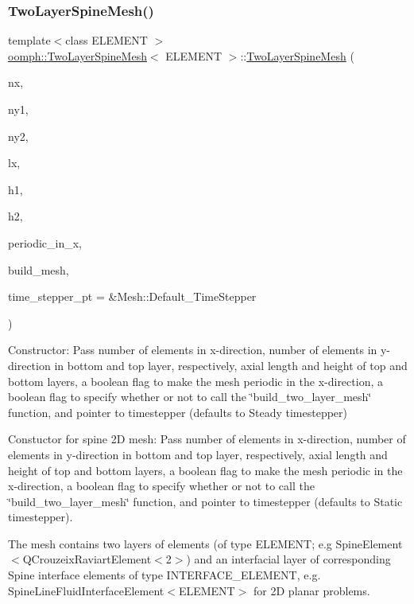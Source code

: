 \subsubsection{\texorpdfstring{Two\+Layer\+Spine\+Mesh()}{TwoLayerSpineMesh()}\hspace{0.1cm}{\footnotesize\ttfamily [3/3]}}
{\footnotesize\ttfamily template$<$class E\+L\+E\+M\+E\+NT $>$ \\
\hyperlink{classoomph_1_1TwoLayerSpineMesh}{oomph\+::\+Two\+Layer\+Spine\+Mesh}$<$ E\+L\+E\+M\+E\+NT $>$\+::\hyperlink{classoomph_1_1TwoLayerSpineMesh}{Two\+Layer\+Spine\+Mesh} (\begin{DoxyParamCaption}\item[{const unsigned \&}]{nx,  }\item[{const unsigned \&}]{ny1,  }\item[{const unsigned \&}]{ny2,  }\item[{const double \&}]{lx,  }\item[{const double \&}]{h1,  }\item[{const double \&}]{h2,  }\item[{const bool \&}]{periodic\+\_\+in\+\_\+x,  }\item[{const bool \&}]{build\+\_\+mesh,  }\item[{Time\+Stepper $\ast$}]{time\+\_\+stepper\+\_\+pt = {\ttfamily \&Mesh\+:\+:Default\+\_\+TimeStepper} }\end{DoxyParamCaption})}



Constructor\+: Pass number of elements in x-\/direction, number of elements in y-\/direction in bottom and top layer, respectively, axial length and height of top and bottom layers, a boolean flag to make the mesh periodic in the x-\/direction, a boolean flag to specify whether or not to call the \char`\"{}build\+\_\+two\+\_\+layer\+\_\+mesh\char`\"{} function, and pointer to timestepper (defaults to Steady timestepper) 

Constuctor for spine 2D mesh\+: Pass number of elements in x-\/direction, number of elements in y-\/direction in bottom and top layer, respectively, axial length and height of top and bottom layers, a boolean flag to make the mesh periodic in the x-\/direction, a boolean flag to specify whether or not to call the \char`\"{}build\+\_\+two\+\_\+layer\+\_\+mesh\char`\"{} function, and pointer to timestepper (defaults to Static timestepper).

The mesh contains two layers of elements (of type E\+L\+E\+M\+E\+NT; e.\+g Spine\+Element$<$Q\+Crouzeix\+Raviart\+Element$<$2$>$) and an interfacial layer of corresponding Spine interface elements of type I\+N\+T\+E\+R\+F\+A\+C\+E\+\_\+\+E\+L\+E\+M\+E\+NT, e.\+g. Spine\+Line\+Fluid\+Interface\+Element$<$\+E\+L\+E\+M\+E\+N\+T$>$ for 2D planar problems. 

